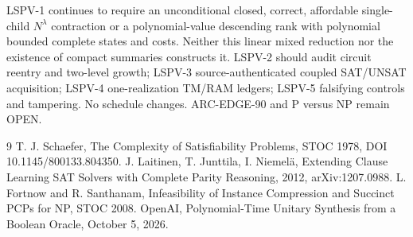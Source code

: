\documentclass[11pt]{article}
\begin{document}
LSPV-1 continues to require an unconditional closed, correct, affordable single-child $N^\lambda$ contraction or a polynomial-value descending rank with polynomial bounded complete states and costs. Neither this linear mixed reduction nor the existence of compact summaries constructs it. LSPV-2 should audit circuit reentry and two-level growth; LSPV-3 source-authenticated coupled SAT/UNSAT acquisition; LSPV-4 one-realization TM/RAM ledgers; LSPV-5 falsifying controls and tampering. No schedule changes. ARC-EDGE-90 and P versus NP remain OPEN.

\begin{thebibliography}{9}
 T. J. Schaefer, The Complexity of Satisfiability Problems, STOC 1978, DOI 10.1145/800133.804350.
 J. Laitinen, T. Junttila, I. Niemel\"a, Extending Clause Learning SAT Solvers with Complete Parity Reasoning, 2012, arXiv:1207.0988.
 L. Fortnow and R. Santhanam, Infeasibility of Instance Compression and Succinct PCPs for NP, STOC 2008.
 OpenAI, Polynomial-Time Unitary Synthesis from a Boolean Oracle, October 5, 2026.
\end{thebibliography}
\end{document}
